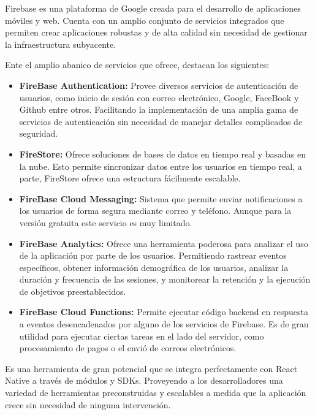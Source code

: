 Firebase es una plataforma de Google creada para el desarrollo de aplicaciones móviles y web.
Cuenta con un amplio conjunto de servicios integrados que permiten crear aplicaciones robustas y de alta calidad sin necesidad de gestionar la infraestructura subyacente.

Ente el amplio abanico de servicios que ofrece, destacan los siguientes:
 
\begin{itemize}

\item \textbf{FireBase Authentication:} Provee diversos servicios de autenticación de usuarios, como inicio de sesión con correo electrónico, Google, FaceBook y Github entre otros. Facilitando la implementación de una amplia gama de servicios de autenticación sin necesidad de manejar detalles complicados de seguridad.

\item \textbf{FireStore:} Ofrece soluciones de bases de datos en tiempo real y basadas en la nube. Esto permite sincronizar datos entre los usuarios en tiempo real, a parte, FireStore ofrece una estructura fácilmente escalable.

\item \textbf{FireBase Cloud Messaging:} Sistema que permite enviar notificaciones a los usuarios de forma segura mediante correo y teléfono. Aunque para la versión gratuita este servicio es muy limitado.

\item \textbf{FireBase Analytics:} Ofrece una herramienta poderosa para analizar el uso de la aplicación por parte de los usuarios.
Permitiendo rastrear eventos específicos, obtener información demográfica de los usuarios, analizar la duración y frecuencia de las sesiones, y monitorear la retención y la ejecución de objetivos preestablecidos.

\item \textbf{FireBase Cloud Functions:} Permite ejecutar código backend en respuesta a eventos desencadenados por alguno de los servicios de Firebase.
Es de gran utilidad para ejecutar ciertas tareas en el lado del servidor, como procesamiento de pagos o el envió de correos electrónicos. 

\end{itemize}

Es una herramienta de gran potencial que se integra perfectamente con React Native a través de módulos y SDKs.
Proveyendo a los desarrolladores una variedad de herramientas preconstruidas y escalables a medida que la aplicación crece sin necesidad de ninguna intervención.


